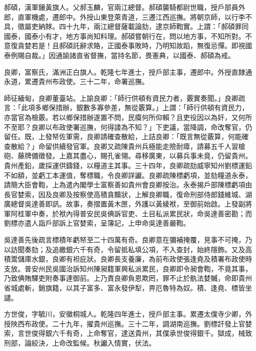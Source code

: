 \begin{pinyinscope}
郝碩，漢軍鑲黃旗人。父郝玉麟，官兩江總督。郝碩襲騎都尉世職，授戶部員外郎，直軍機處，遷郎中。外授山東登萊青道，三遷江西巡撫。將朝京師，以行李不具，徵屬吏納賕。四十九年，兩江總督薩載論劾，逮京師鞫實。上謂：「郝碩罪同國泰，國泰小有才，地方事尚知料理。郝碩嘗朝行在，問以地方事，不知所對。不意復貪婪若是！且郝碩託辭求賂，正國泰事敗時，乃明知故蹈，無復忌憚。即視國泰例賜自裁。」因通諭諸直省督撫，當持名節，畏憲典，以國泰、郝碩為戒。

良卿，富察氏，滿洲正白旗人。乾隆七年進士，授戶部主事，遷郎中。外授直隸通永道，累遷貴州布政使。三十二年，命署巡撫。

師征緬甸，良卿董臺站。上諭良卿：「師行供頓有資民力者，覈實奏聞。」良卿疏言：「此項多鄉保措辦，銀數多寡參差，無從覈算。」上謂：「師行供頓有資民力，亦當官為檢覈。若以鄉保措辦遂置不問，民瘼何所仰賴？且吏役因以為奸，又何所不至耶？良卿以布政使署巡撫，何得諉為不知？」下吏議，當降調，命改奪官，仍留任。既，上發帑佐軍需，良卿請確查散給，上詰良卿：「既言無從覈算，何能確查散給？」命留供續發官軍。良卿又疏陳貴州兵極能走險耐瘴，請募五千人習槍砲、藤牌備徵發。上嘉其盡心，賜孔雀翎。尋移廣東，以募兵事未竟，仍留貴州。貴州產鉛，歲採運供鑄錢，以糧道主其事。三十四年，良卿疏劾威寧知州劉標運鉛不如額，並虧工本運值，奪標職，令良卿詳讞。良卿疏陳標虧項，並劾糧道永泰，請簡大臣會鞫，上為遣內閣學士富察善如貴州會良卿按治。永泰揭戶部陳標虧項由長官婪索，因及良卿及按察使高積貪黷狀，上解良卿職，復命刑部侍郎錢維城、湖廣總督吳達善即訊。故事，奏摺置黃木匣，外護以黃綾袱，至御前始啟。上發副將軍阿桂軍中奏，於袱內得普安民吳倎訴官吏、土目私派累民狀，命吳達善密勘；而劉標亦遣人詣戶部訴上官婪索，呈簿記，上申命吳達善嚴鞫。

吳達善先後疏言標積年虧帑至二十四萬有奇。良卿意在彌補掩覆，見事不可掩，乃以訪聞奏劾；及追繳銀六千有奇，令留抵私填公項，不入查封，始終隱飾。又及高積鬻儲庫水銀，良卿有袒庇狀。良卿長支養廉，為前布政使張逢堯及積署布政使時支放。普安州民吳國治訴知州陳昶籍軍興私派累民，良卿即令昶會鞫，不竟其事，乃致倎賄驛吏附奏事達御前。上乃責良卿負恩欺罔，罪不止於骫法婪贓，命即貴州省城處斬，銷旗籍，以其子富多、富永發伊犁，畀厄魯特為奴。積、逢堯、標皆坐譴。

方世俊，字毓川，安徽桐城人。乾隆四年進士，授戶部主事。累遷太僕寺少卿，外授陜西布政使。二十九年，擢貴州巡撫。三十二年，調湖南巡撫。劉標訐發上官婪索，言世俊得銀六千有奇，上命奪官，逮送貴州，其僕承世俊得銀千。獄成，械致刑部，論絞決，上命改監候。秋讞入情實，伏法。


\end{pinyinscope}
